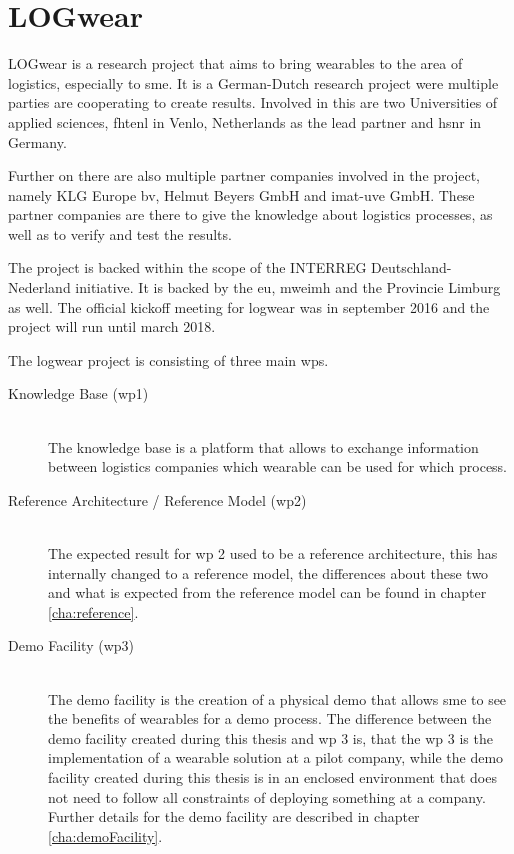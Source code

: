 \section{LOGwear}\label{sec:logwear}
LOGwear is a research project that aims to bring wearables to the area of logistics, especially to \gls{sme}. It is a German-Dutch research project were multiple parties are cooperating to create results. Involved in this are two Universities of applied sciences, \gls{fhtenl} in Venlo, Netherlands as the lead partner and \gls{hsnr} in Germany.

Further on there are also multiple partner companies involved in the project, namely KLG Europe bv, Helmut Beyers GmbH and imat-uve GmbH. These partner companies are there to give the knowledge about logistics processes, as well as to verify and test the results.

The project is backed within the scope of the INTERREG Deutschland-Nederland initiative. It is backed by the \gls{eu}, \gls{mweimh} and the Provincie Limburg as well. The official kickoff meeting for logwear was in september 2016 and the project will run until march 2018. 

The logwear project is consisting of three main \gls{wp}s. \citep{website:logwear}
\begin{description}
	\item[Knowledge Base (\gls{wp}1)] \hfill \\
		The knowledge base is a platform that allows to exchange information between logistics companies which wearable can be used for which process. \citep{bachelorThesis:oliver} \citep{bachelorThesis:sascha}
	\item[Reference Architecture / Reference Model (\gls{wp}2)] \hfill \\
		The expected result for \gls{wp} 2 used to be a reference architecture, this has internally changed to a reference model, the differences about these two and what is expected from the reference model can be found in chapter \ref{cha:reference}. 
	\item[Demo Facility (\gls{wp}3)] \hfill \\
		The demo facility is the creation of a physical demo that allows \gls{sme} to see the benefits of wearables for a demo process. The difference between the demo facility created during this thesis and \gls{wp} 3 is, that the \gls{wp} 3 is the implementation of a wearable solution at a pilot company, while the demo facility created during this thesis is in an enclosed environment that does not need to follow all constraints of deploying something at a company. Further details for the demo facility are described in chapter \ref{cha:demoFacility}. 
\end{description}